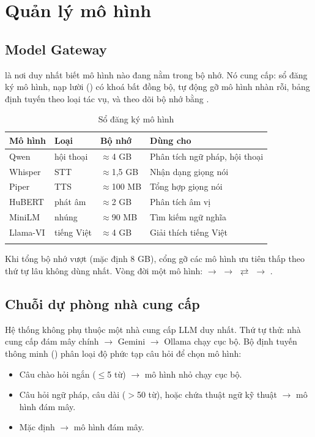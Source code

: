 \section{Quản lý mô hình}

\subsection{Model Gateway}

 là nơi duy nhất biết mô hình nào đang nằm trong bộ nhớ. Nó cung
cấp: sổ đăng ký mô hình, nạp lười () có khoá bất đồng bộ, tự động gỡ mô
hình nhàn rỗi, bảng định tuyến theo loại tác vụ, và theo dõi bộ nhớ bằng .

\begin{longtable}{L{2.6cm} L{2.6cm} L{2.0cm} L{6.0cm}}
\toprule
\textbf{Mô hình} & \textbf{Loại} & \textbf{Bộ nhớ} & \textbf{Dùng cho}\\
\midrule
\endhead
Qwen & hội thoại & \(\approx\)4 GB & Phân tích ngữ pháp, hội thoại\\
Whisper & STT & \(\approx\)1,5 GB & Nhận dạng giọng nói\\
Piper & TTS & \(\approx\)100 MB & Tổng hợp giọng nói\\
HuBERT & phát âm & \(\approx\)2 GB & Phân tích âm vị\\
MiniLM & nhúng & \(\approx\)90 MB & Tìm kiếm ngữ nghĩa\\
Llama-VI & tiếng Việt & \(\approx\)4 GB & Giải thích tiếng Việt\\
\bottomrule
\caption{Sổ đăng ký mô hình}
\end{longtable}

Khi tổng bộ nhớ vượt  (mặc định 8 GB), cổng gỡ các mô hình ưu tiên
thấp theo thứ tự lâu không dùng nhất. Vòng đời một mô hình:
 $\rightarrow$  $\rightarrow$  $\rightleftarrows$
 $\rightarrow$ .

\subsection{Chuỗi dự phòng nhà cung cấp}

Hệ thống không phụ thuộc một nhà cung cấp LLM duy nhất. Thứ tự thử: nhà cung cấp đám mây
chính $\rightarrow$ Gemini $\rightarrow$ Ollama chạy cục bộ. Bộ định tuyến thông minh
() phân loại độ phức tạp câu hỏi để chọn mô hình:

\begin{itemize}[leftmargin=1.4em]
  \item Câu chào hỏi ngắn ($\le$5 từ) $\rightarrow$ mô hình nhỏ chạy cục bộ.
  \item Câu hỏi ngữ pháp, câu dài ($>$50 từ), hoặc chứa thuật ngữ kỹ thuật $\rightarrow$
  mô hình đám mây.
  \item Mặc định $\rightarrow$ mô hình đám mây.
\end{itemize}

